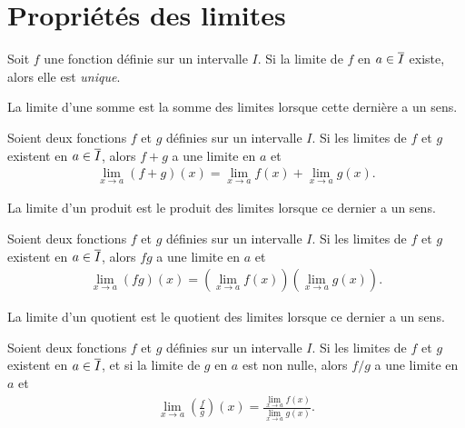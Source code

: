 \documentclass[main.tex]{subfiles}
\begin{document}
\section{Propriétés des limites}

\begin{proposition}

    Soit $f$ une fonction définie sur un intervalle $I$.
    Si la limite de $f$ en $a \in \overline{I}$ existe,
    alors elle est \emph{unique}.
\end{proposition}

La limite d'une somme est la somme des limites
lorsque cette dernière a un sens.

\begin{proposition}

    Soient deux fonctions $f$ et $g$ définies sur un intervalle $I$.
    Si les limites de $f$ et $g$ existent en $a \in \overline{I}$,
    alors $f + g$ a une limite en $a$ et
    \begin{align}
        \lim_{x \to a} (f + g)(x) = \lim_{x \to a} f(x) + \lim_{x \to a} g(x).
    \end{align}
\end{proposition}

La limite d'un produit est le produit des limites
lorsque ce dernier a un sens.

\begin{proposition}

    Soient deux fonctions $f$ et $g$ définies sur un intervalle $I$.
    Si les limites de $f$ et $g$ existent en $a \in \overline{I}$,
    alors $f g$ a une limite en $a$ et
    \begin{align}
        \lim_{x \to a} (fg)(x) = \left(\lim_{x \to a} f(x)\right) \left(\lim_{x \to a} g(x)\right).
    \end{align}
\end{proposition}

La limite d'un quotient est le quotient des limites
lorsque ce dernier a un sens.

\begin{proposition}

    Soient deux fonctions $f$ et $g$ définies sur un intervalle $I$.
    Si les limites de $f$ et $g$ existent en $a \in \overline{I}$,
    et si la limite de $g$ en $a$ est non nulle,
    alors $f / g$ a une limite en $a$ et
    \begin{align}
        \lim_{x \to a} \left(\frac f g\right)(x) = \frac {\lim_{x \to a} f(x)} {\lim_{x \to a} g(x)}.
    \end{align}
\end{proposition}
\end{document}
